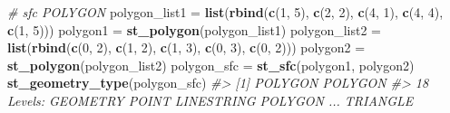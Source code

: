 \documentclass[]{krantz}
\newenvironment{Shaded}{\begin{snugshade}}{\end{snugshade}}
\newcommand{\CommentTok}[1]{\textcolor[rgb]{0.37,0.37,0.37}{\textit{#1}}}
\newcommand{\DecValTok}[1]{\textcolor[rgb]{0.06,0.06,0.06}{#1}}
\newcommand{\KeywordTok}[1]{\textcolor[rgb]{0.27,0.27,0.27}{\textbf{#1}}}
\newcommand{\NormalTok}[1]{#1}
\newcommand{\StringTok}[1]{\textcolor[rgb]{0.5,0.5,0.5}{#1}}
\begin{document}
\begin{Shaded}
\begin{Highlighting}[]
\CommentTok{# sfc POLYGON}
\NormalTok{polygon_list1 =}\StringTok{ }\KeywordTok{list}\NormalTok{(}\KeywordTok{rbind}\NormalTok{(}\KeywordTok{c}\NormalTok{(}\DecValTok{1}\NormalTok{, }\DecValTok{5}\NormalTok{), }\KeywordTok{c}\NormalTok{(}\DecValTok{2}\NormalTok{, }\DecValTok{2}\NormalTok{), }\KeywordTok{c}\NormalTok{(}\DecValTok{4}\NormalTok{, }\DecValTok{1}\NormalTok{), }\KeywordTok{c}\NormalTok{(}\DecValTok{4}\NormalTok{, }\DecValTok{4}\NormalTok{), }\KeywordTok{c}\NormalTok{(}\DecValTok{1}\NormalTok{, }\DecValTok{5}\NormalTok{)))}
\NormalTok{polygon1 =}\StringTok{ }\KeywordTok{st_polygon}\NormalTok{(polygon_list1)}
\NormalTok{polygon_list2 =}\StringTok{ }\KeywordTok{list}\NormalTok{(}\KeywordTok{rbind}\NormalTok{(}\KeywordTok{c}\NormalTok{(}\DecValTok{0}\NormalTok{, }\DecValTok{2}\NormalTok{), }\KeywordTok{c}\NormalTok{(}\DecValTok{1}\NormalTok{, }\DecValTok{2}\NormalTok{), }\KeywordTok{c}\NormalTok{(}\DecValTok{1}\NormalTok{, }\DecValTok{3}\NormalTok{), }\KeywordTok{c}\NormalTok{(}\DecValTok{0}\NormalTok{, }\DecValTok{3}\NormalTok{), }\KeywordTok{c}\NormalTok{(}\DecValTok{0}\NormalTok{, }\DecValTok{2}\NormalTok{)))}
\NormalTok{polygon2 =}\StringTok{ }\KeywordTok{st_polygon}\NormalTok{(polygon_list2)}
\NormalTok{polygon_sfc =}\StringTok{ }\KeywordTok{st_sfc}\NormalTok{(polygon1, polygon2)}
\KeywordTok{st_geometry_type}\NormalTok{(polygon_sfc)}
\CommentTok{#> [1] POLYGON POLYGON}
\CommentTok{#> 18 Levels: GEOMETRY POINT LINESTRING POLYGON ... TRIANGLE}
\end{Highlighting}
\end{Shaded}
\end{document}

